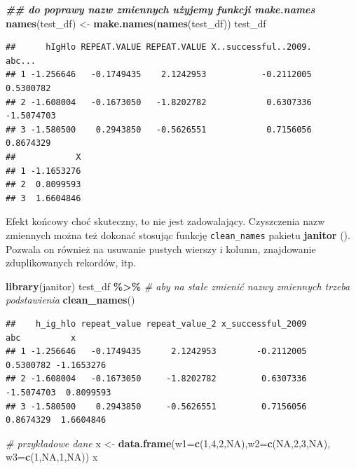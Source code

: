 \documentclass[
]{book}
\newenvironment{Shaded}{\begin{snugshade}}{\end{snugshade}}
\newcommand{\AttributeTok}[1]{\textcolor[rgb]{0.13,0.29,0.53}{#1}}
\newcommand{\CommentTok}[1]{\textcolor[rgb]{0.56,0.35,0.01}{\textit{#1}}}
\newcommand{\ConstantTok}[1]{\textcolor[rgb]{0.56,0.35,0.01}{#1}}
\newcommand{\DecValTok}[1]{\textcolor[rgb]{0.00,0.00,0.81}{#1}}
\newcommand{\DocumentationTok}[1]{\textcolor[rgb]{0.56,0.35,0.01}{\textbf{\textit{#1}}}}
\newcommand{\FunctionTok}[1]{\textcolor[rgb]{0.13,0.29,0.53}{\textbf{#1}}}
\newcommand{\NormalTok}[1]{#1}
\newcommand{\OtherTok}[1]{\textcolor[rgb]{0.56,0.35,0.01}{#1}}
\newcommand{\SpecialCharTok}[1]{\textcolor[rgb]{0.81,0.36,0.00}{\textbf{#1}}}
\theoremstyle{plain}
\theoremstyle{definition}
\theoremstyle{definition}
\theoremstyle{definition}
\theoremstyle{definition}
\theoremstyle{definition}
\theoremstyle{remark}
\begin{document}
\begin{Shaded}
\begin{Highlighting}[]
\DocumentationTok{\#\# do poprawy nazw zmiennych użyjemy funkcji make.names}
\FunctionTok{names}\NormalTok{(test\_df) }\OtherTok{\textless{}{-}} \FunctionTok{make.names}\NormalTok{(}\FunctionTok{names}\NormalTok{(test\_df))}
\NormalTok{test\_df}
\end{Highlighting}
\end{Shaded}

\begin{verbatim}
##      hIgHlo REPEAT.VALUE REPEAT.VALUE X..successful..2009.     abc...
## 1 -1.256646   -0.1749435    2.1242953           -0.2112005  0.5300782
## 2 -1.608004   -0.1673050   -1.8202782            0.6307336 -1.5074703
## 3 -1.580500    0.2943850   -0.5626551            0.7156056  0.8674329
##            X
## 1 -1.1653276
## 2  0.8099593
## 3  1.6604846
\end{verbatim}

Efekt końcowy choć skuteczny, to nie jest zadowalający. Czyszczenia nazw zmiennych można też dokonać stosując funkcję \texttt{clean\_names} pakietu \textbf{janitor} (). Pozwala on również na usuwanie pustych wierszy i kolumn, znajdowanie zduplikowanych rekordów, itp.

\begin{Shaded}
\begin{Highlighting}[]
\FunctionTok{library}\NormalTok{(janitor)}
\NormalTok{test\_df }\SpecialCharTok{\%\textgreater{}\%} \CommentTok{\# aby na stałe zmienić nazwy zmiennych trzeba podstawienia}
    \FunctionTok{clean\_names}\NormalTok{()}
\end{Highlighting}
\end{Shaded}

\begin{verbatim}
##    h_ig_hlo repeat_value repeat_value_2 x_successful_2009        abc          x
## 1 -1.256646   -0.1749435      2.1242953        -0.2112005  0.5300782 -1.1653276
## 2 -1.608004   -0.1673050     -1.8202782         0.6307336 -1.5074703  0.8099593
## 3 -1.580500    0.2943850     -0.5626551         0.7156056  0.8674329  1.6604846
\end{verbatim}

\begin{Shaded}
\begin{Highlighting}[]
\CommentTok{\# przykładowe dane}
\NormalTok{x }\OtherTok{\textless{}{-}} \FunctionTok{data.frame}\NormalTok{(}\AttributeTok{w1=}\FunctionTok{c}\NormalTok{(}\DecValTok{1}\NormalTok{,}\DecValTok{4}\NormalTok{,}\DecValTok{2}\NormalTok{,}\ConstantTok{NA}\NormalTok{),}\AttributeTok{w2=}\FunctionTok{c}\NormalTok{(}\ConstantTok{NA}\NormalTok{,}\DecValTok{2}\NormalTok{,}\DecValTok{3}\NormalTok{,}\ConstantTok{NA}\NormalTok{), }\AttributeTok{w3=}\FunctionTok{c}\NormalTok{(}\DecValTok{1}\NormalTok{,}\ConstantTok{NA}\NormalTok{,}\DecValTok{1}\NormalTok{,}\ConstantTok{NA}\NormalTok{))}
\NormalTok{x}
\end{Highlighting}
\end{Shaded}
\end{document}
